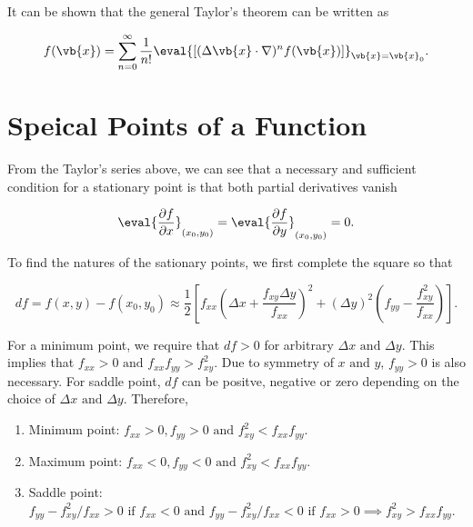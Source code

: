 \documentclass[english,a4paper,12pt]{report}
\begin{document}
It can be shown that the general Taylor's theorem can be written as 

\begin{equation}
    f(\vb{x} ) = \sum_{n=0}^{\infty} \frac{1}{n!} \eval{\left[ (\Delta \vb{x} \cdot \nabla )^{n} f(\vb{x} ) \right]}_{\vb{x} = \vb{x} _{0}}  .
\end{equation}

\section{Speical Points of a Function}

From the Taylor's series above, we can see that a necessary and sufficient condition for a stationary point is that both partial derivatives vanish

\begin{equation}
    \eval{\frac{\partial f}{\partial x}}_{(x_0 ,y_0 )} = \eval{\frac{\partial f}{\partial y}}_{(x_0 ,y_0 )} =0.
\end{equation}

To find the natures of the sationary points, we first complete the square so that 

\begin{equation}
    df = f(x,y) - f(x_0 , y_0 ) \approx  \frac{1}{2} \left[ f_{xx}\left( \Delta x+ \frac{f_{xy}\Delta y }{f_{xx} }  \right)^2 + (\Delta y)^2\left( f_{yy} - \frac{f_{xy}^2 }{f_{xx} }   \right)  \right].
\end{equation}

For a minimum point, we require that \(df>0\) for arbitrary \(\Delta x \text { and } \Delta y\). This implies that \(f_{xx} >0 \text { and }  f_{xx}f_{yy} > f_{xy}^2\). Due to symmetry of \(x \text { and } y\), \(f_{y y } >0\) is also necessary. For saddle point, \(df\) can be positve, negative or zero depending on the choice of \(\Delta x \text { and } \Delta y\). Therefore,

\begin{enumerate}
    \item Minimum point: \(f_{xx} > 0, f_{yy} > 0 \text { and } f_{xy}^2 < f_{xx}f_{yy}\).
    \item Maximum point: \(f_{xx} < 0, f_{yy} < 0 \text { and } f_{xy}^2 < f_{xx}f_{yy}\).
    \item Saddle point: \(f_{yy} - f_{xy}^2/f_{xx} > 0 \text { if } f_{xx} < 0 \text { and } f_{yy} - f_{xy}^2/f_{xx} < 0 \text { if } f_{xx} > 0 \implies f_{xy}^2 > f_{xx}f_{yy}\). 
\end{enumerate}
\end{document}
